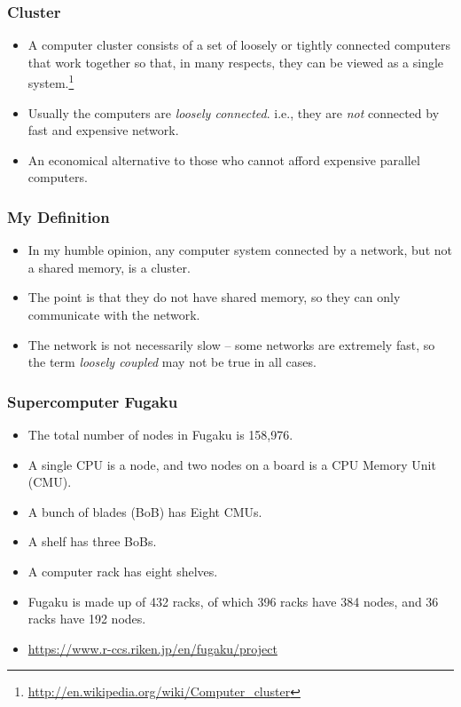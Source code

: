 \documentclass{beamer}
\begin{document}
\begin{CJK}{UTF8}{bsmi}
  \begin{frame}
    \frametitle{Cluster}
    \begin{itemize}
    \item A computer cluster consists of a set of loosely or tightly
      connected computers that work together so that, in many respects,
      they can be viewed as a single
      system.\footnote{\url{http://en.wikipedia.org/wiki/Computer_cluster}}
    \item Usually the computers are {\em loosely connected}. i.e., they
      are {\em not} connected by fast and expensive network.
    \item An economical alternative to those who cannot afford expensive
      parallel computers.
    \end{itemize}
  \end{frame}

  \begin{frame}
    \frametitle{My Definition}
    \begin{itemize}
    \item In my humble opinion, any computer system connected by a
      network, but not a shared memory, is a cluster.
    \item The point is that they do not have shared memory, so they
      can only communicate with the network.
    \item The network is not necessarily slow -- some networks are
      extremely fast, so the term {\em loosely coupled} may not be
      true in all cases.
    \end{itemize}
  \end{frame}

  \begin{frame}
    \frametitle{Supercomputer Fugaku}
    \begin{itemize}
    \item The total number of nodes in Fugaku is 158,976.
    \item A single CPU is a node, and two nodes on a board is a CPU Memory Unit (CMU).
    \item A bunch of blades (BoB) has Eight CMUs.
    \item A shelf has three BoBs.
    \item A computer rack has eight shelves.
    \item Fugaku is made up of 432 racks, of which 396 racks have 384 nodes, and 36 racks have 192 nodes.
    \item \url{https://www.r-ccs.riken.jp/en/fugaku/project}
    \end{itemize}
  \end{frame}


\end{CJK}
\end{document}
